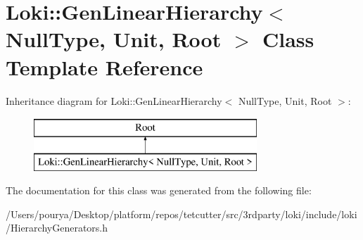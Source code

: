\hypertarget{classLoki_1_1GenLinearHierarchy_3_01NullType_00_01Unit_00_01Root_01_4}{}\section{Loki\+:\+:Gen\+Linear\+Hierarchy$<$ Null\+Type, Unit, Root $>$ Class Template Reference}
\label{classLoki_1_1GenLinearHierarchy_3_01NullType_00_01Unit_00_01Root_01_4}
Inheritance diagram for Loki\+:\+:Gen\+Linear\+Hierarchy$<$ Null\+Type, Unit, Root $>$\+:\begin{figure}[H]
\begin{center}
\leavevmode
\includegraphics[height=2.000000cm]{classLoki_1_1GenLinearHierarchy_3_01NullType_00_01Unit_00_01Root_01_4}
\end{center}
\end{figure}


The documentation for this class was generated from the following file\+:\begin{DoxyCompactItemize}
\item 
/\+Users/pourya/\+Desktop/platform/repos/tetcutter/src/3rdparty/loki/include/loki/Hierarchy\+Generators.\+h\end{DoxyCompactItemize}
